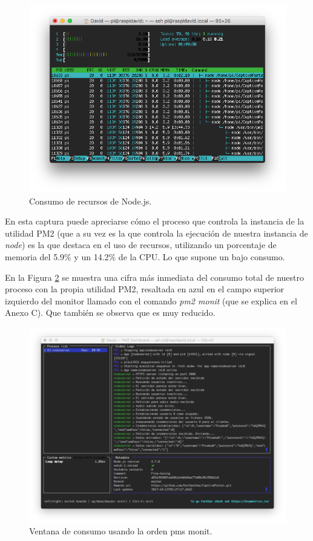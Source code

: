 \begin{figure}[!t]
\begin{center}
\includegraphics[width=0.75\linewidth]{./6_EvalEmpirica/Img/htopNode.png}
\end{center}
\caption{Consumo de recursos de Node.js.}
\label{htopNode}
\end{figure}

En esta captura puede apreciarse cómo el proceso que controla la instancia de la utilidad PM2 (que a su vez es la que controla la ejecución de nuestra instancia de \emph{node}) es la que destaca en el uso de recursos, utilizando un porcentaje de memoria del 5.9\% y un 14.2\% de la CPU. Lo que supone un bajo consumo.

En la Figura \ref{pm2monitNode} se muestra una cifra más inmediata del consumo total de nuestro proceso con la propia utilidad PM2, resaltada en azul en el campo superior izquierdo del monitor llamado con el comando \emph{pm2 monit} (que se explica en el Anexo C). Que también se observa que es muy reducido.

\begin{figure}[!t]
\begin{center}
\includegraphics[width=0.75\linewidth]{./6_EvalEmpirica/Img/pm2monitNode.png}
\end{center}
\caption{Ventana de consumo usando la orden pms monit.}
\label{pm2monitNode}
\end{figure}

